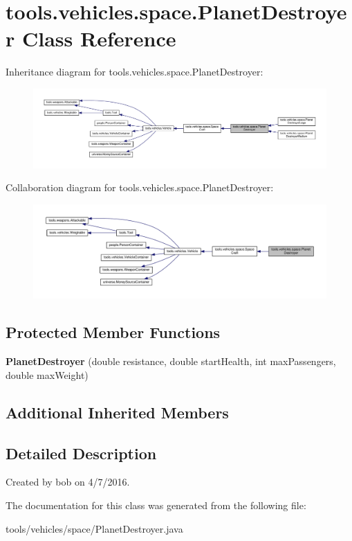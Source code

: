 \hypertarget{classtools_1_1vehicles_1_1space_1_1_planet_destroyer}{}\section{tools.\+vehicles.\+space.\+Planet\+Destroyer Class Reference}
\label{classtools_1_1vehicles_1_1space_1_1_planet_destroyer}


Inheritance diagram for tools.\+vehicles.\+space.\+Planet\+Destroyer\+:
\nopagebreak
\begin{figure}[H]
\begin{center}
\leavevmode
\includegraphics[width=350pt]{classtools_1_1vehicles_1_1space_1_1_planet_destroyer__inherit__graph}
\end{center}
\end{figure}


Collaboration diagram for tools.\+vehicles.\+space.\+Planet\+Destroyer\+:
\nopagebreak
\begin{figure}[H]
\begin{center}
\leavevmode
\includegraphics[width=350pt]{classtools_1_1vehicles_1_1space_1_1_planet_destroyer__coll__graph}
\end{center}
\end{figure}
\subsection*{Protected Member Functions}
\begin{DoxyCompactItemize}
\item 
{\bfseries Planet\+Destroyer} (double resistance, double start\+Health, int max\+Passengers, double max\+Weight)\hypertarget{classtools_1_1vehicles_1_1space_1_1_planet_destroyer_ac6299a3961f997932b83d6db2eb1e5e8}{}\label{classtools_1_1vehicles_1_1space_1_1_planet_destroyer_ac6299a3961f997932b83d6db2eb1e5e8}

\end{DoxyCompactItemize}
\subsection*{Additional Inherited Members}


\subsection{Detailed Description}
Created by bob on 4/7/2016. 

The documentation for this class was generated from the following file\+:\begin{DoxyCompactItemize}
\item 
tools/vehicles/space/Planet\+Destroyer.\+java\end{DoxyCompactItemize}
